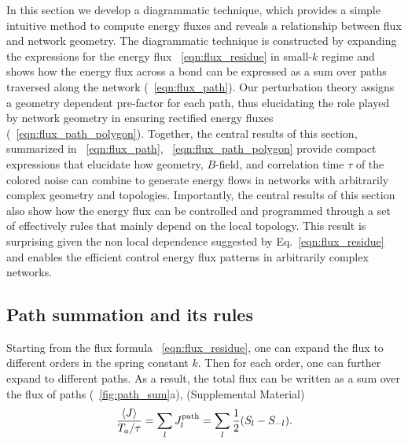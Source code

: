 \documentclass[
 preprint,
 preprintnumbers,
 amsmath,amssymb,
 aps,
 pre,
 longbibliography,
 superscriptaddress,
 10pt, twocolumn
]{revtex4-1}
\begin{document}
In this section we develop a diagrammatic technique, which provides a simple intuitive method to compute energy fluxes and reveals a relationship between flux and network geometry.
The diagrammatic technique is constructed by expanding the expressions for the energy flux \eqnname~\eqref{eqn:flux_residue} in small-$k$ regime and shows how the energy flux across a bond can be expressed as a sum over paths traversed along the network (\eqnname~\eqref{eqn:flux_path}). Our perturbation theory assigns a geometry dependent pre-factor for each path, thus elucidating the role played by network geometry in ensuring rectified energy fluxes (\eqnname~\eqref{eqn:flux_path_polygon}). Together, the central results of this section, summarized in  \eqnname~\ref{eqn:flux_path}, \eqnname~\ref{eqn:flux_path_polygon} provide compact expressions that elucidate how geometry, $B$-field, and correlation time $\tau$ of the colored noise can combine to generate energy flows in networks with arbitrarily complex geometry and topologies. Importantly, the central results of this section also show how the energy flux can be controlled and programmed through a set of effectively rules that mainly depend on the local topology. This result is surprising given the non local dependence suggested by Eq.~\ref{eqn:flux_residue} and enables the efficient control energy flux patterns in arbitrarily complex networks. 


\subsection{Path summation and its rules}
Starting from the flux formula \eqnname~\eqref{eqn:flux_residue}, one can expand the flux to different orders in the spring constant $k$. Then for each order, one can further expand to different paths.
As a result, the total flux can be written as a sum over the flux of paths (\figurename~\ref{fig:path_sum}a), (Supplemental Material)
\begin{equation} \label{eqn:flux_path}
    \frac{\expval{J}}{T_a/\tau} = \sum_l J^\text{path}_l = \sum_l \frac{1}{2}(S_l - S_{-l}).
\end{equation}
\end{document}
